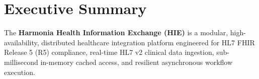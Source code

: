 
\chapter*{Executive Summary}

The \textbf{Harmonia Health Information Exchange (HIE)} is a modular, high-availability, distributed healthcare integration platform engineered for HL7 FHIR Release 5 (R5) compliance, real-time HL7 v2 clinical data ingestion, sub-millisecond in-memory cached access, and resilient asynchronous workflow execution.

